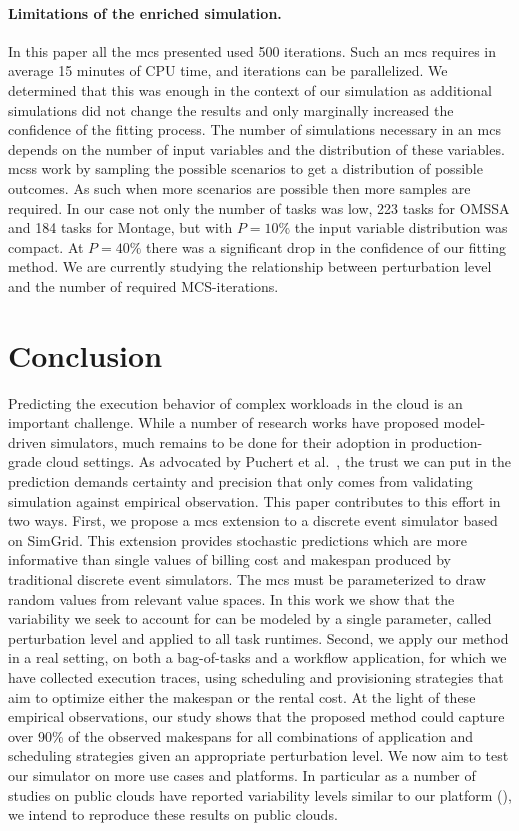 \documentclass[]{llncs}
\begin{document}
\paragraph{Limitations of the enriched simulation.}\label{sec:lim}
%
In this paper all the \ac{mcs} presented used 500 iterations. Such an \ac{mcs}
requires in average 15 minutes of CPU time, and iterations can be parallelized.
We determined that this was enough in the context of our simulation as
additional simulations did not change the results and only marginally increased
the confidence of the fitting process. The number of simulations necessary in an
\ac{mcs} depends on the number of input variables and the distribution of these
variables.  \aclp{mcs} work by sampling the possible scenarios to get a
distribution of possible outcomes. As such when more scenarios are possible then
more samples are required. In our case not only the number of tasks was low, 223
tasks for OMSSA and 184 tasks for Montage, but with $P\!=\!10\%$ the input variable
distribution was compact. At $P=40\%$ there was a significant drop in the
confidence of our fitting method. We are currently studying the relationship
between perturbation level and the number of required MCS-iterations.

\section{Conclusion}
Predicting  the execution  behavior  of complex  workloads in  the  cloud is  an
important challenge. While a number of research works have proposed model-driven
simulators, much remains to be done for their adoption in production-grade cloud
settings. As  advocated by Puchert  et al.~\cite{PucherGWK15}, the trust  we can
put in  the prediction  demands certainty  and precision  that only  comes from
validating simulation against empirical observation.
%
This paper contributes to this effort in two ways. First, we propose a \acl{mcs}
extension  to a  discrete  event  simulator based  on  SimGrid.  This  extension
provides stochastic predictions which are more informative than single values of
billing cost  and makespan  produced by  traditional discrete  event simulators.
The \acl{mcs}  must be parameterized to  draw random values from  relevant value
spaces. In this work we show that the  variability we seek to account for can be
modeled  by a  single parameter,  called perturbation  level and applied  to all
task runtimes. Second, we apply our method in  a real setting, on both a
bag-of-tasks and a workflow  application, for which we have collected  execution
traces, using scheduling and provisioning strategies that  aim to optimize
either the makespan or the  rental cost.  At  the light of  these empirical
observations,  our study shows that the proposed method could capture over 90\%
of the observed makespans for  all  combinations  of  application   and
scheduling  strategies  given  an appropriate perturbation  level. We now aim
to test our simulator  on more use cases and platforms.  In particular as a
number of studies on public clouds have reported variability levels similar to
our platform (\cite{LeitnerC16,pics}), we intend to reproduce these results on
public clouds.



\end{document}
